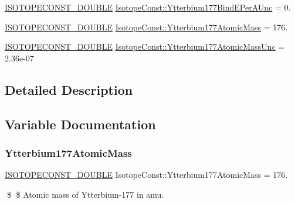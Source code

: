 \begin{DoxyCompactItemize}
\mbox{\hyperlink{group___isotope_const-_macros_ga8f45a7272ce02c0b4c65c44636ed719a}{I\+S\+O\+T\+O\+P\+E\+C\+O\+N\+S\+T\+\_\+\+D\+O\+U\+B\+LE}} \mbox{\hyperlink{group___isotope_const-_ytterbium-_yb177_ga077e24e9f00b8b0eb51abd6c47e7fe4c}{Isotope\+Const\+::\+Ytterbium177\+Bind\+E\+Per\+A\+Unc}} = 0.
\item 
\mbox{\hyperlink{group___isotope_const-_macros_ga8f45a7272ce02c0b4c65c44636ed719a}{I\+S\+O\+T\+O\+P\+E\+C\+O\+N\+S\+T\+\_\+\+D\+O\+U\+B\+LE}} \mbox{\hyperlink{group___isotope_const-_ytterbium-_yb177_ga8f591c6669cd088204bafdcbd3cffa42}{Isotope\+Const\+::\+Ytterbium177\+Atomic\+Mass}} = 176.
\item 
\mbox{\hyperlink{group___isotope_const-_macros_ga8f45a7272ce02c0b4c65c44636ed719a}{I\+S\+O\+T\+O\+P\+E\+C\+O\+N\+S\+T\+\_\+\+D\+O\+U\+B\+LE}} \mbox{\hyperlink{group___isotope_const-_ytterbium-_yb177_ga79447e33062445e96fed060abf3d86a5}{Isotope\+Const\+::\+Ytterbium177\+Atomic\+Mass\+Unc}} = 2.\+36e-\/07
\end{DoxyCompactItemize}


\subsection{Detailed Description}


\subsection{Variable Documentation}
\mbox{\label{group___isotope_const-_ytterbium-_yb177_ga8f591c6669cd088204bafdcbd3cffa42}} 
\subsubsection{\texorpdfstring{Ytterbium177\+Atomic\+Mass}{Ytterbium177AtomicMass}}
{\footnotesize\ttfamily \mbox{\hyperlink{group___isotope_const-_macros_ga8f45a7272ce02c0b4c65c44636ed719a}{I\+S\+O\+T\+O\+P\+E\+C\+O\+N\+S\+T\+\_\+\+D\+O\+U\+B\+LE}} Isotope\+Const\+::\+Ytterbium177\+Atomic\+Mass = 176.}

\$ \$ Atomic mass of Ytterbium-\/177 in amu. \mbox{\label{group___isotope_const-_ytterbium-_yb177_ga79447e33062445e96fed060abf3d86a5}} 
